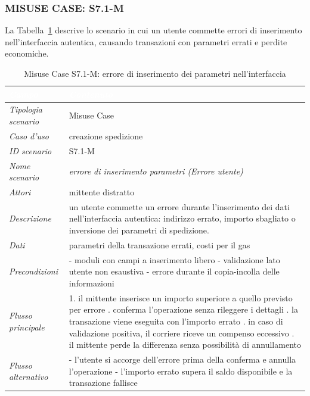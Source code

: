 \subsubsection*{MISUSE CASE: S7.1-M}
La Tabella~\ref{tab:s71m} descrive lo scenario in cui un utente commette errori di inserimento nell'interfaccia autentica, causando transazioni con parametri errati e perdite economiche.
\begin{longtable}{| >{\columncolor{misuseCol}}p{} | p{} |}
\caption{Misuse Case S7.1-M: errore di inserimento dei parametri nell'interfaccia}\label{tab:s71m}\\
\hline
\rowcolor{misuseHeader} \textcolor{white}{\textit{Campo}} & \textcolor{white}{\textit{Contenuto}} \\
\hline
\textit{Tipologia scenario} & Misuse Case \\
\hline
\textit{Caso d'uso} & creazione spedizione \\
\hline
\textit{ID scenario} & S7.1-M \\
\hline
\textit{Nome scenario} & \textit{errore di inserimento parametri (Errore utente)} \\
\hline
\textit{Attori} & mittente distratto \\
\hline
\textit{Descrizione} & un utente commette un errore durante l'inserimento dei dati nell'interfaccia autentica: indirizzo errato, importo sbagliato o inversione dei parametri di spedizione. \\
\hline
\textit{Dati} & parametri della transazione errati, costi per il gas \\
\hline
\textit{Precondizioni} & - moduli con campi a inserimento libero \newline - validazione lato utente non esaustiva \newline - errore durante il copia-incolla delle informazioni \\
\hline
\textit{Flusso principale} & 1. il mittente inserisce un importo superiore a quello previsto per errore \newline 2. conferma l'operazione senza rileggere i dettagli \newline 3. la transazione viene eseguita con l'importo errato \newline 4. in caso di validazione positiva, il corriere riceve un compenso eccessivo \newline 5. il mittente perde la differenza senza possibilità di annullamento \\
\hline
\textit{Flusso alternativo} & - l'utente si accorge dell'errore prima della conferma e annulla l'operazione \newline - l'importo errato supera il saldo disponibile e la transazione fallisce \\

\end{longtable}
